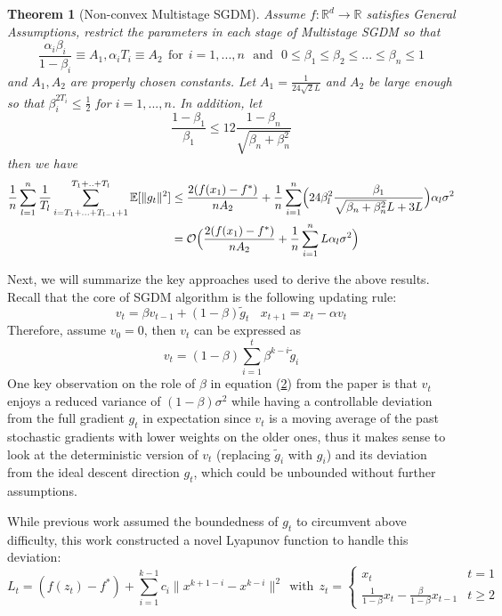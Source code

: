 \documentclass{article}
\newtheorem{theorem}{Theorem}[section]
\begin{document}
\begin{theorem}[Non-convex Multistage SGDM]
	\label{theom43} Assume $f:\mathbb{R}^d \rightarrow \mathbb{R}$ satisfies General Assumptions, restrict the parameters in each stage of Multistage SGDM so that 
\begin{equation}
\label{eq41}
\frac{\alpha_i\beta_i}{1 - \beta_i} \equiv A_1, \alpha_iT_i \equiv A_2 \ \ \text{for}  \ \ i = 1,...,n \ \ \ \text{and} \ \ \
0 \leq \beta_1 \leq \beta_2 \leq ... \leq \beta_n \leq 1
\end{equation}
and $A_1, A_2$ are properly chosen constants. Let $A_1 = \frac{1}{24\sqrt{2}L}$ and $A_2$ be large enough so that $\beta_i^{2T_i} \leq \frac{1}{2}$ for $i = 1,...,n$. In addition, let
\[
\frac{1 - \beta_1}{\beta_1} \leq 12 \frac{1 - \beta_n}{\sqrt{\beta_n + \beta_n^2}}
\] then we have
\[
\begin{split}
\frac{1}{n}\sum_{l = 1}^{n}\frac{1}{T_l}\sum_{i = T_1 + ... + T_{l - 1} + 1}^{T_1 + .. + T_l}\mathbb{E}[\|g_t\|^2] &\leq \frac{2(f(x_1) - f^*)}{nA_2} + \frac{1}{n}\sum_{i = 1}^n\Bigl(24\beta^2_l\frac{\beta_1}{\sqrt{\beta_n + \beta_n^2}L + 3L}\Bigr)\alpha_l\sigma^2\\
&= \mathcal{O}\Bigl(\frac{2(f(x_1) - f^*)}{nA_2} + \frac{1}{n}\sum_{i = 1}^nL\alpha_l\sigma^2\Bigr)
\end{split}
\]
\end{theorem}
Next, we will summarize the key approaches used to derive the above results. Recall that the core of SGDM algorithm is the following updating rule:
\[
v_t = \beta v_{t - 1} + (1 - \beta)\tilde{g}_t \ \ \ \
x_{t + 1} = x_t - \alpha v_t
\]
Therefore, assume $v_0 = 0$, then $v_t$ can be expressed as 
\begin{equation}
\label{eq42}
v_t = (1 - \beta)\sum_{i = 1}^{t}\beta^{k - i}\tilde{g}_i
\end{equation}
One key observation on the role of $\beta$ in equation (\hyperref[eq42]{2}) from the paper is that $v_t$ enjoys a reduced variance of $(1 - \beta)\sigma^2$ while having a controllable deviation from the full gradient $g_t$ in expectation since $v_t$ is a moving average of the past stochastic gradients with lower weights on the older ones, thus it makes sense to look at the deterministic version of $v_t$ (replacing $\tilde{g}_i$ with $g_i$) and its deviation from the ideal descent direction $g_t$, which could be unbounded without further assumptions.

While previous work assumed the boundedness of $g_t$ to circumvent above difficulty, this work constructed a novel Lyapunov function to handle this deviation:
\[
L_t = (f(z_t) - f^*) + \sum_{i = 1}^{k - 1}c_i\|x^{k + 1 - i} - x^{k - i}\|^2 \ \
\text{with} \ \  z_t = \begin{cases}
	x_t & t = 1 \\
	\frac{1}{1 - \beta}x_t - \frac{\beta}{1 - \beta}x_{t - 1} & t \geq 2
\end{cases}
\]
\end{document}

